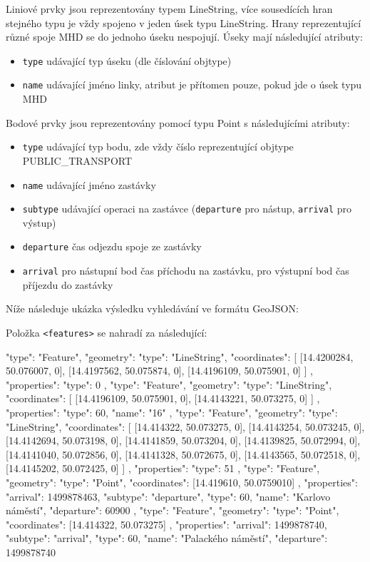 Liniové prvky jsou reprezentovány typem LineString, více sousedících hran
stejného typu je vždy spojeno v jeden úsek typu LineString. Hrany reprezentující různé
spoje MHD se do jednoho úseku nespojují. Úseky mají následující atributy: 
\begin{itemize}
	\item {\tt type} udávající typ úseku (dle číslování objtype)
	\item {\tt name} udávající jméno linky, atribut je přítomen pouze, pokud
	jde o úsek typu MHD
\end{itemize}
Bodové prvky jsou reprezentovány pomocí typu Point s následujícími atributy: 
\begin{itemize}
	\item {\tt type} udávající typ bodu, zde vždy číslo reprezentující objtype PUBLIC\_TRANSPORT  	
	\item {\tt name} udávající jméno zastávky
	\item {\tt subtype} udávající operaci na zastávce ({\tt departure} pro
	nástup, {\tt arrival} pro výstup)
	\item {\tt departure} čas odjezdu spoje ze zastávky
	\item {\tt arrival} pro nástupní bod čas příchodu na zastávku, pro
	výstupní bod čas příjezdu do zastávky
\end{itemize}
Níže následuje ukázka výsledku vyhledávání ve formátu GeoJSON:
\begin{code}
\end{code}

Položka {\tt <features>} se nahradí za následující:
\begin{code}
{
	"type": "Feature",
	"geometry":
	{
		"type": "LineString",
		"coordinates":
		[
			[14.4200284, 50.076007, 0], 
			[14.4197562, 50.075874, 0], 
			[14.4196109, 50.075901, 0]
		]
	}, 
	"properties": {"type": 0}
}, 
{
	"type": "Feature",
	"geometry": 
	{
		"type": "LineString",
		"coordinates":
		[
			[14.4196109, 50.075901, 0],
			[14.4143221, 50.073275, 0]
		]
	},
	"properties": {"type": 60, "name": "16"}
}, {
	"type": "Feature",
	"geometry": 
	{
		"type": "LineString",
		"coordinates":
		[
			[14.414322, 50.073275, 0],
			[14.4143254, 50.073245, 0],
			[14.4142694, 50.073198, 0],
			[14.4141859, 50.073204, 0],
			[14.4139825, 50.072994, 0],
			[14.4141040, 50.072856, 0],
			[14.4141328, 50.072675, 0],
			[14.4143565, 50.072518, 0],
			[14.4145202, 50.072425, 0]
		]
	},
	"properties": {"type": 51}
}, {
	"type": "Feature",
	"geometry":
	{
		"type": "Point", 
		"coordinates": [14.419610, 50.0759010]
	},
	"properties": 
	{
		"arrival": 1499878463, 
		"subtype": "departure", 
		"type": 60, 
		"name": "Karlovo náměstí",
		"departure": 60900
	}
}, {
	"type": "Feature",
	"geometry":
	{
		"type": "Point",
		"coordinates": [14.414322, 50.073275]
	},
	"properties": 
	{
		"arrival": 1499878740,
		"subtype": "arrival",
		"type": 60,
		"name": "Palackého náměstí",
		"departure": 1499878740
	}
}
\end{code}
